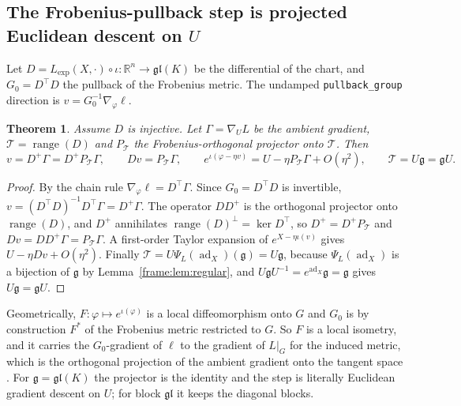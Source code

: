 \documentclass[11pt]{article}
\newtheorem{theorem}{Theorem}[section]
\theoremstyle{definition}
\theoremstyle{remark}
\providecommand{\gl}{\mathfrak{gl}}
\providecommand{\ad}{\operatorname{ad}}
\providecommand{\R}{\mathbb{R}}
\providecommand{\g}{\mathfrak{g}}
\providecommand{\range}{\operatorname{range}}
\begin{document}
\subsection{The Frobenius-pullback step is projected Euclidean descent on \texorpdfstring{$U$}{U}}\label{frame:sec:pullback}

Let $D=L_{\exp}(X,\cdot)\circ\iota:\R^n\to\gl(K)$ be the differential of the chart, and $G_0=D^\top D$ the pullback of the Frobenius metric. The undamped \texttt{pullback\_group} direction is $v=G_0^{-1}\nabla_\varphi\ell$.

\begin{theorem}\label{frame:thm:projected}
Assume $D$ is injective. Let $\Gamma=\nabla_UL$ be the ambient gradient, $\mathcal{T}=\range(D)$ and $P_\mathcal{T}$ the Frobenius-orthogonal projector onto $\mathcal{T}$. Then
\begin{equation}\label{frame:eq:projected}
v=D^+\Gamma=D^+P_\mathcal{T}\Gamma,\qquad Dv=P_\mathcal{T}\Gamma,\qquad e^{\iota(\varphi-\eta v)}=U-\eta P_\mathcal{T}\Gamma+O(\eta^2),\qquad \mathcal{T}=U\g=\g U.
\end{equation}
\end{theorem}
\begin{proof}
By the chain rule $\nabla_\varphi\ell=D^\top\Gamma$. Since $G_0=D^\top D$ is invertible, $v=(D^\top D)^{-1}D^\top\Gamma=D^+\Gamma$. The operator $DD^+$ is the orthogonal projector onto $\range(D)$, and $D^+$ annihilates $\range(D)^\perp=\ker D^\top$, so $D^+=D^+P_\mathcal{T}$ and $Dv=DD^+\Gamma=P_\mathcal{T}\Gamma$. A first-order Taylor expansion of $e^{X-\eta\iota(v)}$ gives $U-\eta Dv+O(\eta^2)$. Finally $\mathcal{T}=U\Psi_L(\ad_X)(\g)=U\g$, because $\Psi_L(\ad_X)$ is a bijection of $\g$ by Lemma~\ref{frame:lem:regular}, and $U\g U^{-1}=e^{\ad_X}\g=\g$ gives $U\g=\g U$.
\end{proof}

Geometrically, $F:\varphi\mapsto e^{\iota(\varphi)}$ is a local diffeomorphism onto $G$ and $G_0$ is by construction $F^*$ of the Frobenius metric restricted to $G$. So $F$ is a local isometry, and it carries the $G_0$-gradient of $\ell$ to the gradient of $L|_G$ for the induced metric, which is the orthogonal projection of the ambient gradient onto the tangent space \cite[Sec.~3.6.1]{frame:Absil2008}. For $\g=\gl(K)$ the projector is the identity and the step is literally Euclidean gradient descent on $U$; for block $\gl$ it keeps the diagonal blocks.
\end{document}

